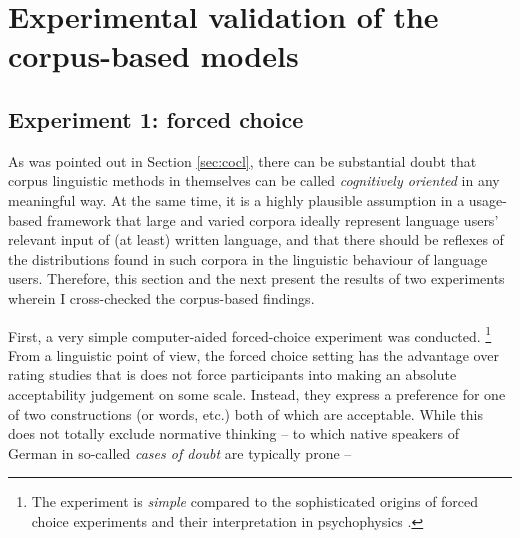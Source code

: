 \documentclass[USenglish]{article}
\begin{document}






\section{Experimental validation of the corpus-based models}
\label{sec:externalvalidation}

\subsection{Experiment 1: forced choice}

%

As was pointed out in Section \ref{sec:cocl}, there can be substantial doubt that corpus linguistic methods in themselves can be called \textit{cognitively oriented} in any meaningful way.
At the same time, it is a highly plausible assumption in a usage-based framework that large and varied corpora ideally represent language users' relevant input of (at least) written language, and that there should be reflexes of the distributions found in such corpora in the linguistic behaviour of language users.
Therefore, this section and the next present the results of two experiments wherein I cross-checked the corpus-based findings.

First, a very simple computer-aided forced-choice experiment was conducted.%
\footnote{The experiment is \textit{simple} compared to the sophisticated origins of forced choice experiments and their interpretation in psychophysics \citep[166--179]{MacmillanCreelman2005}.}
From a linguistic point of view, the forced choice setting has the advantage over rating studies that is does not force participants into making an absolute acceptability judgement on some scale.
Instead, they express a preference for one of two constructions (or words, etc.) both of which are acceptable.
While this does not totally exclude normative thinking -- to which native speakers of German in so-called \textit{cases of doubt} are typically prone -- 
\end{document}
